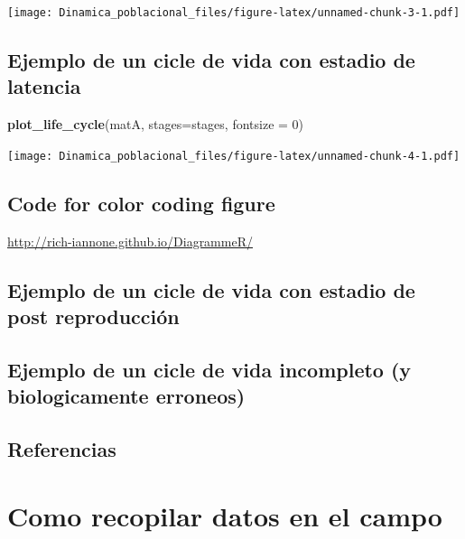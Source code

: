 \documentclass[
]{book}
\newenvironment{Shaded}{\begin{snugshade}}{\end{snugshade}}
\newcommand{\AttributeTok}[1]{\textcolor[rgb]{0.13,0.29,0.53}{#1}}
\newcommand{\DecValTok}[1]{\textcolor[rgb]{0.00,0.00,0.81}{#1}}
\newcommand{\FunctionTok}[1]{\textcolor[rgb]{0.13,0.29,0.53}{\textbf{#1}}}
\newcommand{\NormalTok}[1]{#1}
\theoremstyle{definition}
\theoremstyle{definition}
\theoremstyle{definition}
\theoremstyle{definition}
\theoremstyle{remark}
\begin{document}
\texttt{[image: Dinamica\_poblacional\_files/figure-latex/unnamed-chunk-3-1.pdf]}

\hypertarget{ejemplo-de-un-cicle-de-vida-con-estadio-de-latencia}{%
\section{Ejemplo de un cicle de vida con estadio de latencia}\label{ejemplo-de-un-cicle-de-vida-con-estadio-de-latencia}}

\begin{Shaded}
\begin{Highlighting}[]
\FunctionTok{plot\_life\_cycle}\NormalTok{(matA, }\AttributeTok{stages=}\NormalTok{stages, }\AttributeTok{fontsize =} \DecValTok{0}\NormalTok{)}
\end{Highlighting}
\end{Shaded}

\texttt{[image: Dinamica\_poblacional\_files/figure-latex/unnamed-chunk-4-1.pdf]}

\hypertarget{code-for-color-coding-figure}{%
\section{Code for color coding figure}\label{code-for-color-coding-figure}}

\url{http://rich-iannone.github.io/DiagrammeR/}

\hypertarget{ejemplo-de-un-cicle-de-vida-con-estadio-de-post-reproducciuxf3n}{%
\section{Ejemplo de un cicle de vida con estadio de post reproducción}\label{ejemplo-de-un-cicle-de-vida-con-estadio-de-post-reproducciuxf3n}}

\hypertarget{ejemplo-de-un-cicle-de-vida-incompleto-y-biologicamente-erroneos}{%
\section{Ejemplo de un cicle de vida incompleto (y biologicamente erroneos)}\label{ejemplo-de-un-cicle-de-vida-incompleto-y-biologicamente-erroneos}}

\hypertarget{referencias-1}{%
\section{Referencias}\label{referencias-1}}

\hypertarget{como-recopilar-datos-en-el-campo}{%
\chapter{Como recopilar datos en el campo}\label{como-recopilar-datos-en-el-campo}}
\end{document}

